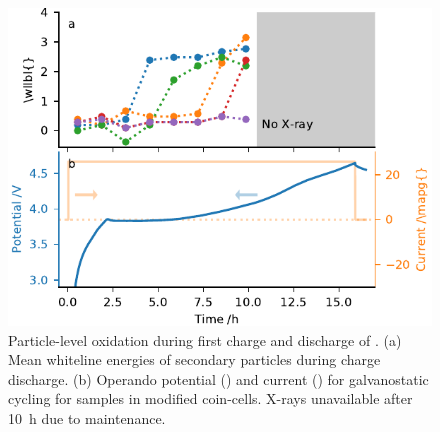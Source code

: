 \documentclass{article}
\begin{document}
\begin{figure}
  \includegraphics{figures/NMC532-particle-echem.pdf}
  \caption{Particle-level oxidation during first charge and discharge
    of \nmc[532]{}. (a) Mean whiteline energies of secondary particles
    during charge discharge. (b) Operando potential
    (\textcolor{C0}{\mplline{}}) and current
    (\textcolor{C1}{\mplline{}}) for galvanostatic cycling for
    \nmc[532]{} samples in modified coin-cells. X-rays unavailable
    after \SI{10}{\hour} due to maintenance.}
  \label{fig:nmc532-particles}
\end{figure}
\end{document}

